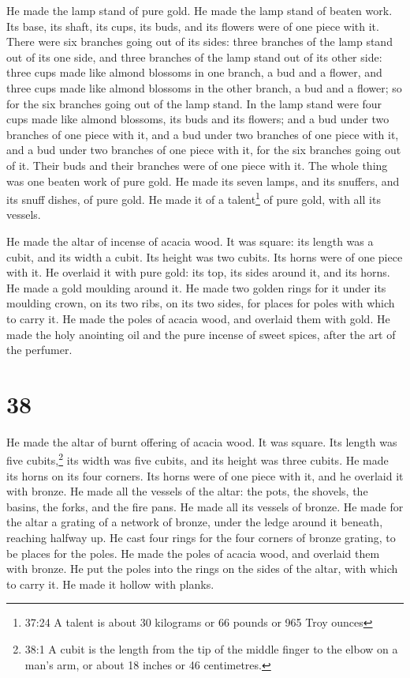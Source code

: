  He made the lamp stand of pure gold. He made the lamp
stand of beaten work. Its base, its shaft, its cups, its buds, and its
flowers were of one piece with it.  There were six branches
going out of its sides: three branches of the lamp stand out of its one
side, and three branches of the lamp stand out of its other side:
 three cups made like almond blossoms in one branch, a bud
and a flower, and three cups made like almond blossoms in the other
branch, a bud and a flower; so for the six branches going out of the
lamp stand.  In the lamp stand were four cups made like
almond blossoms, its buds and its flowers;  and a bud under
two branches of one piece with it, and a bud under two branches of one
piece with it, and a bud under two branches of one piece with it, for
the six branches going out of it.  Their buds and their
branches were of one piece with it. The whole thing was one beaten work
of pure gold.  He made its seven lamps, and its snuffers,
and its snuff dishes, of pure gold.  He made it of a
talent\footnote{37:24 A talent is about 30 kilograms or 66 pounds or 965
  Troy ounces} of pure gold, with all its vessels.

 He made the altar of incense of acacia wood. It was
square: its length was a cubit, and its width a cubit. Its height was
two cubits. Its horns were of one piece with it.  He
overlaid it with pure gold: its top, its sides around it, and its horns.
He made a gold moulding around it.  He made two golden
rings for it under its moulding crown, on its two ribs, on its two
sides, for places for poles with which to carry it.  He
made the poles of acacia wood, and overlaid them with gold.
 He made the holy anointing oil and the pure incense of
sweet spices, after the art of the perfumer.

\hypertarget{section-37}{%
\section{38}\label{section-37}}

 He made the altar of burnt offering of acacia wood. It was
square. Its length was five cubits,\footnote{38:1 A cubit is the length
  from the tip of the middle finger to the elbow on a man's arm, or
  about 18 inches or 46 centimetres.} its width was five cubits, and its
height was three cubits.  He made its horns on its four
corners. Its horns were of one piece with it, and he overlaid it with
bronze.  He made all the vessels of the altar: the pots, the
shovels, the basins, the forks, and the fire pans. He made all its
vessels of bronze.  He made for the altar a grating of a
network of bronze, under the ledge around it beneath, reaching halfway
up.  He cast four rings for the four corners of bronze
grating, to be places for the poles.  He made the poles of
acacia wood, and overlaid them with bronze.  He put the
poles into the rings on the sides of the altar, with which to carry it.
He made it hollow with planks.

